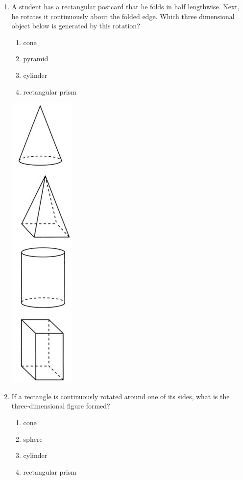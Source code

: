 \documentclass[12pt, twoside]{article}
\begin{document}
\begin{enumerate}
  \item A student has a rectangular postcard that he folds in half lengthwise. Next, he rotates it continuously about the folded edge. Which three dimensional object below is generated by this rotation?
    \begin{multicols}{2}
    \begin{enumerate}
      \item cone
      \item pyramid
      \item cylinder
      \item rectangular prism
    \end{enumerate}
    \includegraphics[scale=0.5]{solids.png}
    \end{multicols}

\newpage
  \item %
   If a rectangle is continuously rotated around one of its sides, what is the three-dimensional figure formed?
   \begin{multicols}{2}
    \begin{enumerate}
      \item cone
      \item sphere
      \item cylinder
      \item rectangular prism
    \end{enumerate}
  \end{multicols}


\end{enumerate}
\end{document}
